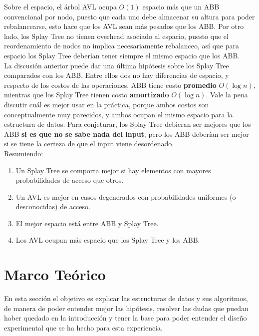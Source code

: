 \documentclass[12pt,letterpaper]{report}
\begin{document}
Sobre el espacio, el árbol AVL ocupa $O(1)$ espacio más que un ABB convencional por nodo, puesto que cada uno debe almacenar su altura para poder rebalancearse, esto hace que los AVL sean más pesados que los ABB. Por otro lado, los Splay Tree no tienen overhead asociado al espacio, puesto que el reordenamiento de nodos no implica necesariamente rebalanceo, así que para espacio los Splay Tree deberían tener siempre el mismo espacio que los ABB.\\

La discusión anterior puede dar una última hipótesis sobre los Splay Tree comparados con los ABB. Entre ellos dos no hay diferencias de espacio, y respecto de los costos de las operaciones, ABB tiene costo \textbf{promedio} $O(\log n)$, mientras que los Splay Tree tienen costo \textbf{amortizado} $O(\log n)$. Vale la pena discutir cuál es mejor usar en la práctica, porque ambos costos son conceptualmente muy parecidos, y ambos ocupan el mismo espacio para la estructura de datos. Para conjeturar, los Splay Tree debieran ser mejores que los ABB \textbf{si es que no se sabe nada del input}, pero los ABB deberían ser mejor si se tiene la certeza de que el input viene desordenado.\\

Resumiendo:

\begin{enumerate}
\item Un Splay Tree se comporta mejor si hay elementos con mayores probabilidades de acceso que otros.
\item Un AVL es mejor en casos degenerados con probabilidades uniformes (o desconocidas) de acceso.
\item El mejor espacio está entre ABB y Splay Tree.
\item Los AVL ocupan más espacio que los Splay Tree y los ABB.
\end{enumerate}

\newpage
\section{Marco Teórico}
\label{sec:marco}

En esta sección el objetivo es explicar las estructuras de datos y sus algoritmos, de manera de poder entender mejor las hipótesis, resolver las dudas que puedan haber quedado en la introducción y tener la base para poder entender el diseño experimental que se ha hecho para esta experiencia.\\
\end{document}
